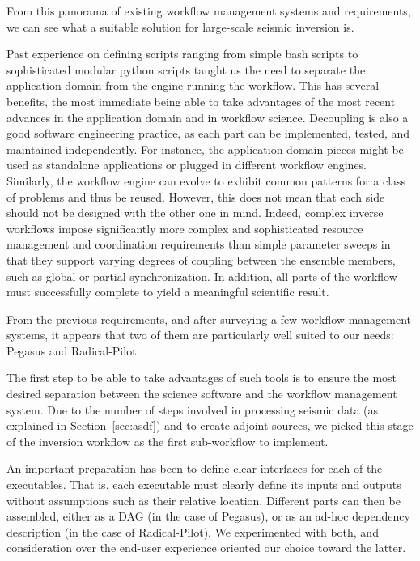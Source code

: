 From this panorama of existing workflow management systems and requirements, we
can see what a suitable solution for large-scale seismic inversion is.

Past experience on defining scripts ranging from simple bash scripts to
sophisticated modular python scripts taught us the need to separate the
application domain from the engine running the workflow.
This has several benefits, the most immediate being able to take advantages
of the most recent advances in the application domain and in workflow science.
Decoupling is also a good software engineering practice, as each part can be
implemented, tested, and maintained independently. For instance, the application
domain pieces might be used as standalone applications or plugged in different
workflow engines. Similarly, the workflow engine can evolve to exhibit common
patterns for a class of problems and thus be reused.
However, this does not mean that each side should not be designed with the other
one in mind. Indeed, complex inverse workflows impose significantly more complex
and sophisticated resource management and coordination requirements than simple
parameter sweeps in that they support varying degrees of coupling between the
ensemble members, such as global or partial synchronization. In addition, all
parts of the workflow must successfully complete to yield a meaningful scientific
result.

From the previous requirements, and after surveying a few workflow management
systems, it appears that two of them are particularly well suited to our needs:
Pegasus and Radical-Pilot.

The first step to be able to take advantages of such tools is to ensure the most
desired separation between the science software and the workflow management
system. Due to the number of steps involved in processing seismic data
(as explained in Section~\ref{sec:asdf}) and to create adjoint sources, we picked this
stage of the inversion workflow as the first sub-workflow to implement.

An important preparation has been to define clear interfaces for each of the
executables. That is, each executable must clearly define its inputs and outputs
without assumptions such as their relative location.
Different parts can then be assembled, either as a DAG (in the case of Pegasus),
or as an ad-hoc dependency description (in the case of Radical-Pilot).
We experimented with both, and consideration over the end-user experience
oriented our choice toward the latter.

